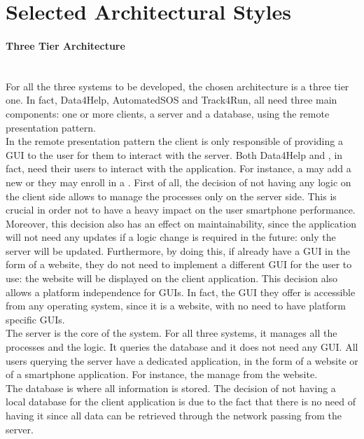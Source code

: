\documentclass[../../DD.tex]{subfiles}
\begin{document}
\section{Selected Architectural Styles}
	\paragraph{Three Tier Architecture}\mbox{}\\
	\indent For all the three systems to be developed, the chosen architecture is a three tier one. In fact, Data4Help, AutomatedSOS and Track4Run, all need three main components: one or more clients, a server and a database, using the remote presentation pattern.\\
	\indent In the remote presentation pattern the client is only responsible of providing a GUI to the user for them to interact with the server. Both Data4Help and , in fact, need their users to interact with the application. For instance, a  may add a new  or they may enroll in a . First of all, the decision of not having any logic on the client side allows to manage the processes only on the server side. This is crucial in order not to have a heavy impact on the user smartphone performance. Moreover, this decision also has an effect on maintainability, since the application will not need any updates if a logic change is required in the future: only the server will be updated. Furthermore, by doing this, if  already have a GUI in the form of a website, they do not need to implement a different GUI for the user to use: the  website will be displayed on the client application. This decision also allows a platform independence for  GUIs. In fact, the GUI they offer is accessible from any operating system, since it is a website, with no need to have platform specific GUIs.\\
	\indent The server is the core of the system. For all three systems, it manages all the processes and the logic. It queries the database and it does not need any GUI. All users querying the server have a dedicated application, in the form of a website or of a smartphone application. For instance, the  manage  from the  website.\\
	\indent The database is where all information is stored. The decision of not having a local database for the client application is due to the fact that there is no need of having it since all data can be retrieved through the network passing from the server.
\end{document}
